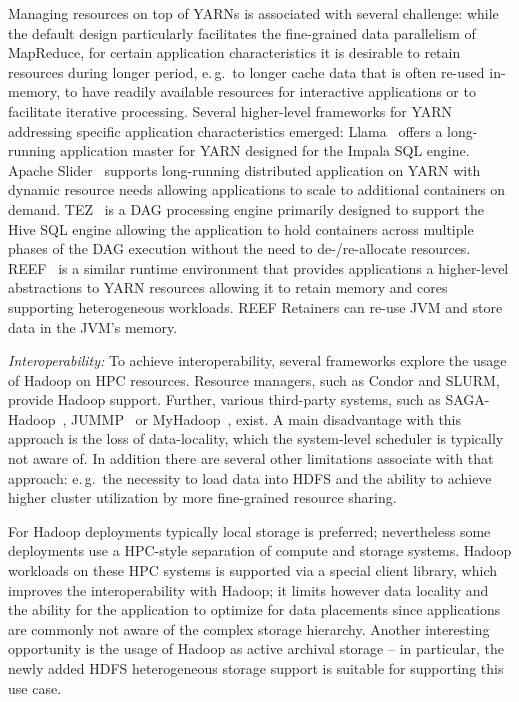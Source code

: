 \documentclass{sig-alternate}
\begin{document}
Managing resources on top of YARNs is associated with several
challenge: while the default design particularly facilitates the
fine-grained data parallelism of MapReduce, for certain application
characteristics it is desirable to retain resources during longer
period, e.\,g.\ to longer cache data that is often re-used in-memory,
to have readily available resources for interactive applications or to
facilitate iterative processing. Several higher-level frameworks for
YARN addressing specific application characteristics emerged:
Llama~\cite{llama} offers a long-running application master for YARN
designed for the Impala SQL engine. Apache Slider~\cite{apache-slider}
supports long-running distributed application on YARN with dynamic
resource needs allowing applications to scale to additional containers
on demand.  TEZ~\cite{tez} is a DAG processing engine primarily
designed to support the Hive SQL engine allowing the application to
hold containers across multiple phases of the DAG execution without
the need to de-/re-allocate resources.
REEF~\cite{Chun:2013:RRE:2536274.2536318} is a similar runtime
environment that provides applications a higher-level abstractions to
YARN resources allowing it to retain memory and cores supporting
heterogeneous workloads. REEF Retainers can re-use JVM and store data
in the JVM's memory.


\emph{Interoperability:} To achieve interoperability, several frameworks
explore the usage of Hadoop on HPC resources. Resource
managers, such as Condor and SLURM, provide Hadoop support. Further, various
third-party systems, such as SAGA-Hadoop~\cite{saga-hadoop},
JUMMP~\cite{6702650} or MyHadoop~\cite{Krishnan04myhadoop}, exist. A main
disadvantage with this approach is the loss of data-locality, which the
system-level scheduler is typically not aware of. In addition there are several
other limitations associate with that approach: e.\,g.\ the necessity to load
data into HDFS and the ability to achieve higher cluster utilization by more
fine-grained resource sharing.

For Hadoop deployments typically local storage is preferred; nevertheless some
deployments use a HPC-style separation of compute and storage systems. Hadoop
workloads on these HPC systems is supported via a special client library, which
improves the interoperability with Hadoop; it limits however data locality and
the ability for the application to optimize for data placements since
applications are commonly not aware of the complex storage hierarchy. Another
interesting opportunity is the usage of Hadoop as active archival storage -- in
particular, the newly added HDFS heterogeneous storage support is suitable for
supporting this use case.\\
\\
\end{document}
